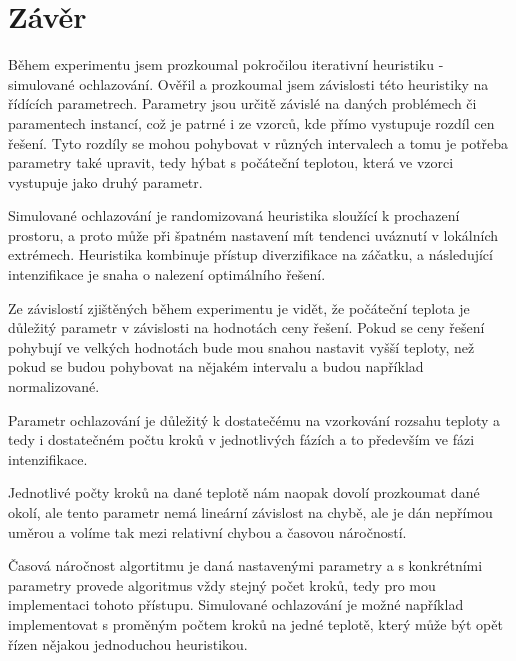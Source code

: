 \documentclass[11pt]{article}
\begin{document}
\section{Závěr}\label{kap:zaver}
Během experimentu jsem prozkoumal pokročilou iterativní heuristiku - simulované ochlazování. Ověřil a prozkoumal jsem závislosti této heuristiky na řídících parametrech. Parametry jsou určitě závislé na daných problémech či paramentech instancí, což je patrné i ze vzorců, kde přímo vystupuje rozdíl cen řešení. Tyto rozdíly se mohou pohybovat v různých intervalech a tomu je potřeba parametry také upravit, tedy hýbat s počáteční teplotou, která ve vzorci vystupuje jako druhý parametr. 

Simulované ochlazování je randomizovaná heuristika sloužící k prochazení prostoru, a proto může při špatném nastavení mít tendenci uváznutí v lokálních extrémech. Heuristika kombinuje přístup diverzifikace na záčatku, a následující intenzifikace je snaha o nalezení optimálního řešení. 

Ze závislostí zjištěných během experimentu je vidět, že počáteční teplota je důležitý parametr v závislosti na hodnotách ceny řešení. Pokud se ceny řešení pohybují ve velkých hodnotách bude mou snahou nastavit vyšší teploty, než pokud se budou pohybovat na nějakém intervalu a budou například normalizované. 

Parametr ochlazování je důležitý k dostatečému na vzorkování rozsahu teploty a tedy i dostatečném počtu kroků v jednotlivých fázích a to především ve fázi intenzifikace. 

Jednotlivé počty kroků na dané teplotě nám naopak dovolí prozkoumat dané okolí, ale tento parametr nemá lineární závislost na chybě, ale je dán nepřímou uměrou a volíme tak mezi relativní chybou a časovou náročností. 

Časová náročnost algortitmu je daná nastavenými parametry a s konkrétními parametry provede algoritmus vždy stejný počet kroků, tedy pro mou implementaci tohoto přístupu. Simulované ochlazování je možné například implementovat s proměným počtem kroků na jedné teplotě, který může být opět řízen nějakou jednoduchou heuristikou.
\end{document}
